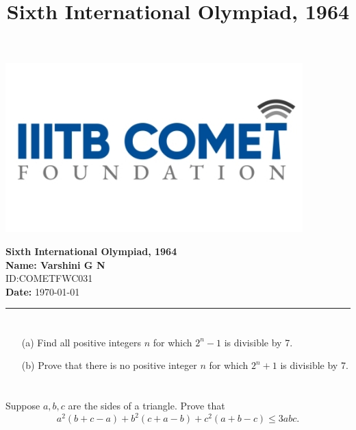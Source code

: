 \documentclass[12pt,a4paper]{article}
\begin{document}
\begin{center}
\begin{minipage}{0.2\textwidth}
    \includegraphics[width=\linewidth]{iiit_logo.png}
\end{minipage}
\hfill
\begin{minipage}{0.75\textwidth}
    \centering
    {\Large \textbf{Sixth International Olympiad, 1964}}\\[1ex8]
    \textbf{Name: Varshini G N} \\[0.5ex]
    ID:COMETFWC031\\
    \textbf{Date:} \today
\end{minipage}
\end{center}



\vspace{1em}
\title{Sixth International Olympiad, 1964}
\hrule
\vspace{1em}

\section{}
\begin{itemize}
    \item[(a)] Find all positive integers $n$ for which $2^n - 1$ is divisible by 7.
    \item[(b)] Prove that there is no positive integer $n$ for which $2^n + 1$ is divisible by 7.
\end{itemize}

\section{}
Suppose $a,b,c$ are the sides of a triangle. Prove that
\[
a^2(b + c - a) + b^2(c + a - b) + c^2(a + b - c) \leq 3abc.
\]
\end{document}
